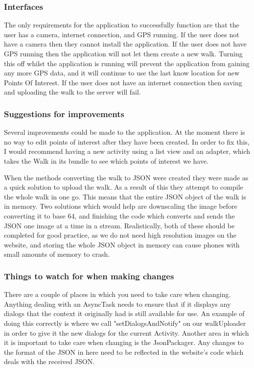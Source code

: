 \documentclass{project}
\begin{document}
\subsubsection{Interfaces}
The only requirements for the application to successfully function are that the user has a camera, internet connection, and GPS running.
If the user does not have a camera then they cannot install the application.
If the user does not have GPS running then the application will not let them create a new walk. Turning this off whilst the application is running
will prevent the application from gaining any more GPS data, and it will continue to use the last know location for new Points Of Interest.
If the user does not have an internet connection then saving and uploading the walk to the server will fail.

\subsubsection{Suggestions for improvements}
Several improvements could be made to the application. At the moment there is no way to edit points of interest after they have been created.
In order to fix this, I would recommend having a new activity using a list view and an adapter, which takes the Walk in its bundle to see
which points of interest we have.

When the methods converting the walk to JSON were created they were made as a quick solution to upload the walk.
As a result of this they attempt to compile the whole walk in one go. This means that the entire JSON object of the walk is in
memory. Two solutions which would help are downscaling the image before converting it to base 64, and finishing the code which
converts and sends the JSON one image at a time in a stream. Realistically, both of these should be completed for good practice, as we do
not need high resolution images on the website, and storing the whole JSON object in memory can cause phones with small amounts of memory
to crash.

\subsubsection{Things to watch for when making changes}
There are a couple of places in which you need to take care when changing. Anything dealing with an AsyncTask needs to ensure that if it displays any dialogs
that the context it originally had is still available for use. An example of doing this correctly is where we call "setDialogsAndNotify" on our walkUploader
in order to give it the new dialogs for the current Activity.
Another area in which it is important to take care when changing is the JsonPackager. Any changes to the format of the JSON in here need to be reflected
in the website's code which deals with the received JSON.
\end{document}
